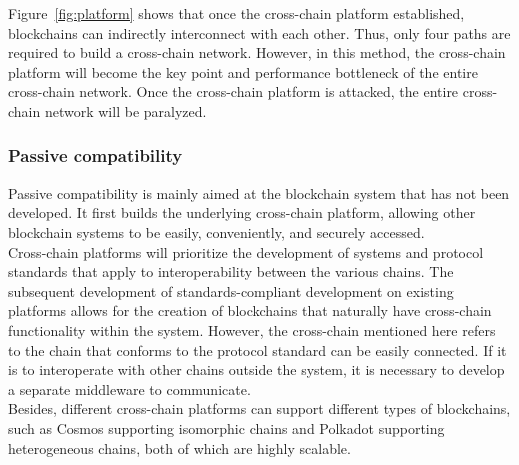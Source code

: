 \begin{enumerate}
\begin{figure}[H]
        \end{figure}
  Figure~\ref{fig:platform} shows that once the cross-chain platform established, blockchains can indirectly interconnect with each other. Thus, only four paths are required to build a cross-chain network. However, in this method, the cross-chain platform will become the key point and performance bottleneck of the entire cross-chain network. Once the cross-chain platform is attacked, the entire cross-chain network will be paralyzed.
\end{enumerate}
\subsubsection{Passive compatibility}
\noindent Passive compatibility is mainly aimed at the blockchain system that has not been developed. It first builds the underlying cross-chain platform, allowing other blockchain systems to be easily, conveniently, and securely accessed.\\

\noindent Cross-chain platforms will prioritize the development of systems and protocol standards that apply to interoperability between the various chains. The subsequent development of standards-compliant development on existing platforms allows for the creation of blockchains that naturally have cross-chain functionality within the system. However, the cross-chain mentioned here refers to the chain that conforms to the protocol standard can be easily connected. If it is to interoperate with other chains outside the system, it is necessary to develop a separate middleware to communicate.\\

\noindent Besides, different cross-chain platforms can support different types of blockchains, such as Cosmos supporting isomorphic chains and Polkadot supporting heterogeneous chains, both of which are highly scalable.